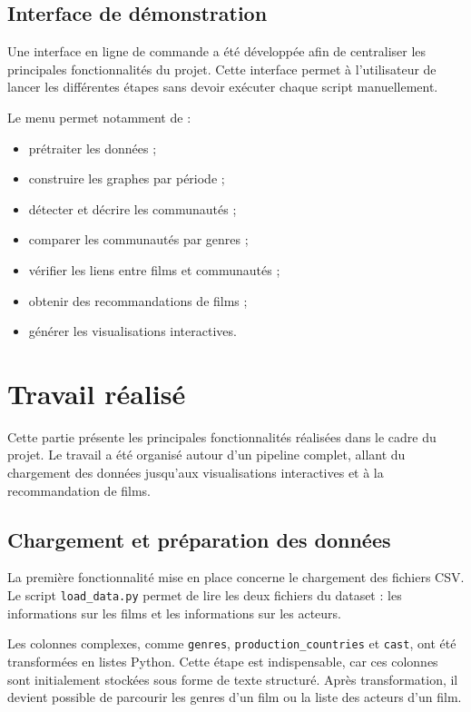 \documentclass[11pt,a4paper,oneside,openany]{report}
\begin{document}
\section{Interface de démonstration}

Une interface en ligne de commande a été développée afin de centraliser les principales fonctionnalités du projet. Cette interface permet à l’utilisateur de lancer les différentes étapes sans devoir exécuter chaque script manuellement.

Le menu permet notamment de :

\begin{itemize}
    \item prétraiter les données ;
    \item construire les graphes par période ;
    \item détecter et décrire les communautés ;
    \item comparer les communautés par genres ;
    \item vérifier les liens entre films et communautés ;
    \item obtenir des recommandations de films ;
    \item générer les visualisations interactives.
\end{itemize}

\chapter{Travail réalisé}

Cette partie présente les principales fonctionnalités réalisées dans le cadre du projet. Le travail a été organisé autour d’un pipeline complet, allant du chargement des données jusqu’aux visualisations interactives et à la recommandation de films.

\section{Chargement et préparation des données}

La première fonctionnalité mise en place concerne le chargement des fichiers CSV. Le script \texttt{load\_data.py} permet de lire les deux fichiers du dataset : les informations sur les films et les informations sur les acteurs.

Les colonnes complexes, comme \texttt{genres}, \texttt{production\_countries} et \texttt{cast}, ont été transformées en listes Python. Cette étape est indispensable, car ces colonnes sont initialement stockées sous forme de texte structuré. Après transformation, il devient possible de parcourir les genres d’un film ou la liste des acteurs d’un film.
\end{document}

